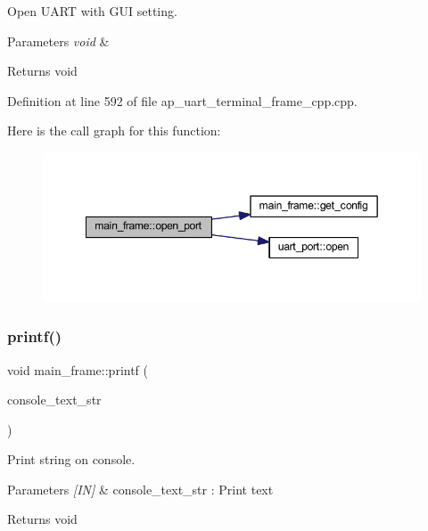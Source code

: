 Open U\+A\+RT with G\+UI setting. 


\begin{DoxyParams}{Parameters}
{\em void} & \\
\hline
\end{DoxyParams}
\begin{DoxyReturn}{Returns}
void 
\end{DoxyReturn}


Definition at line 592 of file ap\+\_\+uart\+\_\+terminal\+\_\+frame\+\_\+cpp.\+cpp.

Here is the call graph for this function\+:
\nopagebreak
\begin{figure}[H]
\begin{center}
\leavevmode
\includegraphics[width=349pt]{group___u_a_r_t__terminal_gad3d8849cc0df34ac89516e637e827c32_cgraph}
\end{center}
\end{figure}
\mbox{\label{group___u_a_r_t__terminal_ga864637bd3c6b2b038e9962866bed8a68}} 
\subsubsection{printf()}
{\footnotesize\ttfamily void main\+\_\+frame\+::printf (\begin{DoxyParamCaption}\item[{wx\+String}]{console\+\_\+text\+\_\+str }\end{DoxyParamCaption})}



Print string on console. 


\begin{DoxyParams}{Parameters}
{\em \mbox{[}\+I\+N\mbox{]}} & console\+\_\+text\+\_\+str \+: Print text \\
\hline
\end{DoxyParams}
\begin{DoxyReturn}{Returns}
void 
\end{DoxyReturn}


